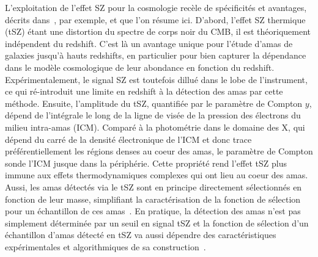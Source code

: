 L'exploitation de l'effet SZ pour la cosmologie recèle de spécificités
et avantages, décrits dans~\citet{Carlstrom2002}, par exemple, et que
l'on résume ici. D'abord, l'effet SZ thermique (tSZ)
étant une distortion du spectre de corps noir du CMB, il est
théoriquement indépendent du redshift. C'est là un avantage unique
pour l'étude d'amas de galaxies jusqu'à hauts redshifts, en
particulier pour bien capturer la dépendance dans le modèle cosmologique de
leur abondance en fonction du redshift. Expérimentalement, le signal SZ est toutefois dillué
dans le lobe de l'instrument, ce qui ré-introduit une limite en
redshift à la détection des amas par cette méthode. Ensuite,
l'amplitude du tSZ, quantifiée par le paramètre de Compton $y$, dépend
de l'intégrale le long de la ligne de visée de la pression des
électrons du milieu intra-amas (ICM). %
Comparé à la photométrie dans le domaine des X, qui dépend du carré de la densité
électronique de l'ICM et donc trace préférentiellement les régions
denses au coeur des amas, le paramètre de Compton sonde l'ICM jusque
dans la périphérie. Cette propriété rend l'effet tSZ plus immune aux
effets thermodynamiques complexes qui ont lieu au coeur des
amas. Aussi, les amas détectés via le tSZ sont en principe directement
sélectionnés en fonction de leur masse, simplifiant la caractérisation
de la fonction de sélection pour un échantillon de ces
amas~\citep{Holder2000}. En pratique, la détection des amas n'est pas
simplement déterminée par un seuil en signal tSZ et la fonction de
sélection d'un échantillon d'amas détecté en tSZ va aussi dépendre des
caractéristiques expérimentales et algorithmiques de sa
construction~\citep{Melin2005}.

